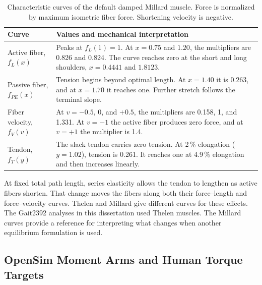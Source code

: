 \begin{table}[htbp]
\centering\small
\caption{Characteristic curves of the default damped Millard muscle. Force is normalized by maximum isometric fiber force. Shortening velocity is negative.}
\label{tab:app_millard_curves}
\begin{tabularx}{\textwidth}{@{}p{}X@{}}
\toprule
Curve & Values and mechanical interpretation \\
\midrule
Active fiber, $f_L(x)$ & Peaks at $f_L(1)=1$. At $x=0.75$ and $1.20$, the multipliers are 0.826 and 0.824. The curve reaches zero at the short and long shoulders, $x=0.4441$ and $1.8123$. \\
Passive fiber, $f_{PE}(x)$ & Tension begins beyond optimal length. At $x=1.40$ it is 0.263, and at $x=1.70$ it reaches one. Further stretch follows the terminal slope. \\
Fiber velocity, $f_V(v)$ & At $v=-0.5$, 0, and $+0.5$, the multipliers are 0.158, 1, and 1.331. At $v=-1$ the active fiber produces zero force, and at $v=+1$ the multiplier is 1.4. \\
Tendon, $f_T(y)$ & The slack tendon carries zero tension. At 2\,\% elongation ($y=1.02$), tension is 0.261. It reaches one at 4.9\,\% elongation and then increases linearly. \\
\bottomrule
\end{tabularx}
\end{table}

At fixed total path length, series elasticity allows the tendon to lengthen as active fibers shorten. That change moves the fibers along both their force--length and force--velocity curves. Thelen and Millard give different curves for these effects. The Gait2392 analyses in this dissertation used Thelen muscles. The Millard curves provide a reference for interpreting what changes when another equilibrium formulation is used.

\subsection{OpenSim Moment Arms and Human Torque Targets}
\label{sec:app_opensim_targets}

